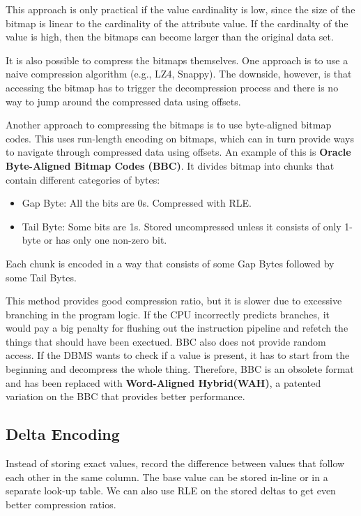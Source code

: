 \documentclass[11pt]{article}
\begin{document}
This approach is only practical if the value cardinality is low, since the size of the bitmap is
linear to the cardinality of the attribute value. If the cardinalty of the value is high, then the
bitmaps can become larger than the original data set.

It is also possible to compress the bitmaps themselves. One approach is to use a naive
compression algorithm (e.g., LZ4, Snappy). The downside, however, is that accessing the bitmap has
to trigger the decompression process and there is no way to jump around the compressed data using
offsets.

Another approach to compressing the bitmaps is to use byte-aligned bitmap codes. This uses
run-length encoding on bitmaps, which can in turn provide ways to navigate through compressed data
using offsets. An example of this is \textbf{Oracle Byte-Aligned Bitmap Codes (BBC)}. It divides
bitmap into chunks that contain different categories of bytes:
\begin{itemize}
    \item Gap Byte: All the bits are 0s. Compressed with RLE.
    \item Tail Byte: Some bits are 1s. Stored uncompressed unless it consists of only 1-byte or has only one non-zero bit.
\end{itemize}
Each chunk is encoded in a way that consists of some Gap Bytes followed by some Tail Bytes. 

This method provides good compression ratio, but it is slower due to excessive branching in the
program logic. If the CPU incorrectly predicts branches, it would pay a big penalty for flushing out
the instruction pipeline and refetch the things that should have been exectued. BBC also does not
provide random access. If the DBMS wants to check if a value is present, it has to start from the
beginning and decompress the whole thing. Therefore, BBC is an obsolete format and has been replaced
with \textbf{Word-Aligned Hybrid(WAH)}, a patented variation on the BBC that provides better
performance.

\subsection*{Delta Encoding}
Instead of storing exact values, record the difference between values that follow each other in the same column. The base value can be stored in-line or in a separate look-up table. We can also use RLE on the stored deltas to get even better compression ratios.
\end{document}
